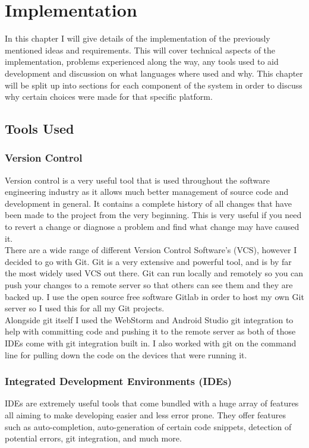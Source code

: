 \chapter{Implementation}
\label{chap:implementation}
In this chapter I will give details of the implementation of the previously mentioned ideas and requirements. This will cover technical aspects of the implementation, problems experienced along the way, any tools used to aid development and discussion on what languages where used and why. This chapter will be split up into sections for each component of the system in order to discuss why certain choices were made for that specific platform.

\section{Tools Used}
\subsection{Version Control}
Version control is a very useful tool that is used throughout the software engineering industry as it allows much better management of source code and development in general. It contains a complete history of all changes that have been made to the project from the very beginning. This is very useful if you need to revert a change or diagnose a problem and find what change may have caused it.
\\
\indent There are a wide range of different Version Control Software's (VCS), however I decided to go with Git. Git is a very extensive and powerful tool, and is by far the most widely used VCS out there. Git can run locally and remotely so you can push your changes to a remote server so that others can see them and they are backed up. I use the open source free software Gitlab in order to host my own Git server so I used this for all my Git projects.
\\
\indent Alongside git itself I used the WebStorm and Android Studio git integration to help with committing code and pushing it to the remote server as both of those IDEs come with git integration built in. I also worked with git on the command line for pulling down the code on the devices that were running it.

\subsection{Integrated Development Environments (IDEs)}
IDEs are extremely useful tools that come bundled with a huge array of features all aiming to make developing easier and less error prone. They offer features such as auto-completion, auto-generation of certain code snippets, detection of potential errors, git integration, and much more.

